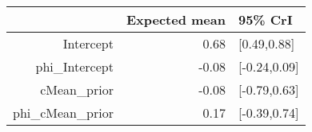 \begin{tabular}{rrl}
  \hline
 & Expected mean & 95\% CrI \\ 
  \hline
Intercept & 0.68 & [0.49,0.88] \\ 
  phi\_Intercept & -0.08 & [-0.24,0.09] \\ 
  cMean\_prior & -0.08 & [-0.79,0.63] \\ 
  phi\_cMean\_prior & 0.17 & [-0.39,0.74] \\ 
   \hline
\end{tabular}

